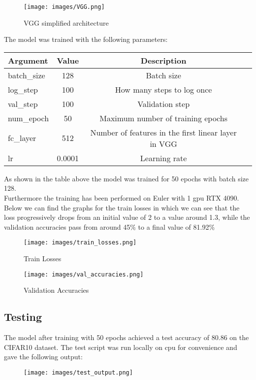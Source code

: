 \documentclass{ETHExercise}
\begin{document}
\begin{figure}[!h]
  \centering
  \texttt{[image: images/VGG.png]}
  \caption{VGG simplified architecture}
\end{figure}

The model was trained with the following parameters:
\begin{center}
  \begin{tabular}{|l|c|c|c|}
    \hline
    \textbf{Argument} & \textbf{Value} &  \textbf{Description} \\
    \hline
    batch\_size & 128 & Batch size \\
    log\_step & 100 & How many steps to log once \\
    val\_step & 100 &  Validation step \\
    num\_epoch & 50 & Maximum number of training epochs \\
    fc\_layer & 512 & Number of features in the first linear layer in VGG \\
    lr & 0.0001 &  Learning rate \\
    \hline
  \end{tabular}
\end{center}


As shown in the table above the model was trained for 50 epochs with batch size 128.
\\
Furthermore the training has been performed on Euler with 1 gpu RTX 4090. 
\\
Below we can find the graphs for the train losses in which we can see that the 
loss progressively drops from an initial value of 2 to a value around 1.3, while the validation accuracies
pass from around 45\% to a final value of 81.92\%

\begin{figure}[h]
  \centering
  \texttt{[image: images/train\_losses.png]}
  \caption{Train Losses}
\end{figure}
\begin{figure}[h]
  \centering
  \texttt{[image: images/val\_accuracies.png]}
  \caption{Validation Accuracies}
\end{figure}

\newpage
\subsection{Testing}
The model after training with 50 epochs achieved a test accuracy of 80.86 on the CIFAR10 dataset.
The test script was run locally on cpu for convenience and gave the following output:
\begin{figure}[h]
  \centering
  \texttt{[image: images/test\_output.png]}
\end{figure}
\end{document}
